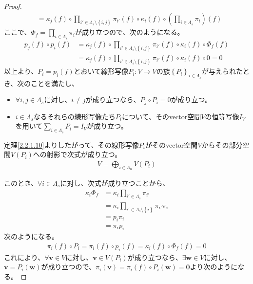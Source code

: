 \documentclass[dvipdfmx]{jsarticle}
\begin{document}
\begin{proof}
\begin{align*}
&= \kappa_{j}(f) \circ \prod_{i' \in \varLambda_{s} \setminus \left\{ i,j \right\}} {\pi_{i'}(f)} \circ \kappa_{i}(f) \circ \left( \prod_{i \in \varLambda_{s}} \pi_{i} \right)(f)
\end{align*}
ここで、$\varPhi_{f} = \prod_{i \in \varLambda_{s}} {\pi_{i}}$が成り立つので、次のようになる。
\begin{align*}
p_{j}(f) \circ p_{i}(f) &= \kappa_{j}(f) \circ \prod_{i' \in \varLambda_{s} \setminus \left\{ i,j \right\}} {\pi_{i'}(f)} \circ \kappa_{i}(f) \circ \varPhi_{f}(f) \\
&= \kappa_{j}(f) \circ \prod_{i' \in \varLambda_{s} \setminus \left\{ i,j \right\}} {\pi_{i'}(f)} \circ \kappa_{i}(f) \circ 0 = 0
\end{align*}
以上より、$P_{i} = p_{i}(f)$とおいて線形写像$P_{i}:V \rightarrow V$の族$\left\{ P_{i} \right\}_{i \in \varLambda_{s}}$が与えられたとき、次のことを満たし、
\begin{itemize}
\item
  $\forall i,j \in \varLambda_{s}$に対し、$i \neq j$が成り立つなら、$P_{j} \circ P_{i} = 0$が成り立つ。
\item
  $i \in \varLambda_{s}$なるそれらの線形写像たち$P_{i}$について、そのvector空間$V$の恒等写像$I_{V}$を用いて$\sum_{i \in \varLambda_{s}} P_{i} = I_{V}$が成り立つ。
\end{itemize}
定理\ref{2.2.1.10}よりしたがって、その線形写像$P_{i}$がそのvector空間$V$からその部分空間$V\left( P_{i} \right)$への射影で次式が成り立つ。
\begin{align*}
V = \bigoplus_{i \in \varLambda_{n}} {V\left( P_{i} \right)}
\end{align*}\par
このとき、$\forall i \in \varLambda_{s}$に対し、次式が成り立つことから、
\begin{align*}
\kappa_{i}\varPhi_{f} &= \kappa_{i}\prod_{i' \in \varLambda_{s}} {\pi_{i'}} \\
&= \kappa_{i}\prod_{i' \in \varLambda_{s} \setminus \left\{ i \right\}} {\pi_{i'}}\pi_{i} \\
&= p_{i}\pi_{i} \\
&= \pi_{i}p_{i}
\end{align*}
次のようになる。
\begin{align*}
\pi_{i}(f) \circ P_{i} = \pi_{i}(f) \circ p_{i}(f) = \kappa_{i}(f) \circ \varPhi_{f}(f) = 0
\end{align*}
これにより、$\forall\mathbf{v} \in V$に対し、$\mathbf{v} \in V\left( P_{i} \right)$が成り立つなら、$\exists\mathbf{w} \in V$に対し、$\mathbf{v} = P_{i}\left( \mathbf{w} \right)$が成り立つので、$\pi_{i}\left( \mathbf{v} \right) = \pi_{i}(f) \circ P_{i}\left( \mathbf{w} \right) = \mathbf{0}$より次のようになる。

\end{proof}
\end{document}
